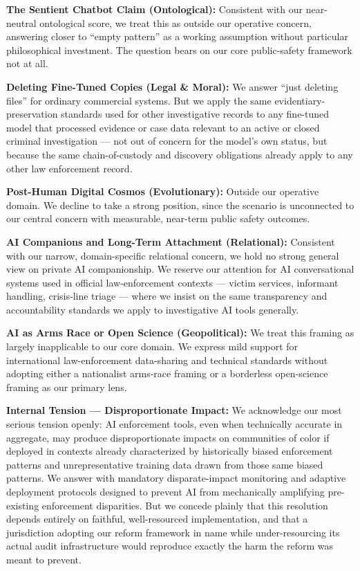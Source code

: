 \textbf{The Sentient Chatbot Claim (Ontological):} Consistent with our
near-neutral ontological score, we treat this as outside our operative
concern, answering closer to ``empty pattern'' as a working assumption
without particular philosophical investment. The question bears on our
core public-safety framework not at all.

\textbf{Deleting Fine-Tuned Copies (Legal \& Moral):} We answer ``just
deleting files'' for ordinary commercial systems. But we apply the same
evidentiary-preservation standards used for other investigative records
to any fine-tuned model that processed evidence or case data relevant to
an active or closed criminal investigation --- not out of concern for
the model's own status, but because the same chain-of-custody and
discovery obligations already apply to any other law enforcement record.

\textbf{Post-Human Digital Cosmos (Evolutionary):} Outside our operative
domain. We decline to take a strong position, since the scenario is
unconnected to our central concern with measurable, near-term public
safety outcomes.

\textbf{AI Companions and Long-Term Attachment (Relational):} Consistent
with our narrow, domain-specific relational concern, we hold no strong
general view on private AI companionship. We reserve our attention for
AI conversational systems used in official law-enforcement contexts ---
victim services, informant handling, crisis-line triage --- where we
insist on the same transparency and accountability standards we apply to
investigative AI tools generally.

\textbf{AI as Arms Race or Open Science (Geopolitical):} We treat this
framing as largely inapplicable to our core domain. We express mild
support for international law-enforcement data-sharing and technical
standards without adopting either a nationalist arms-race framing or a
borderless open-science framing as our primary lens.

\textbf{Internal Tension --- Disproportionate Impact:} We acknowledge
our most serious tension openly: AI enforcement tools, even when
technically accurate in aggregate, may produce disproportionate impacts
on communities of color if deployed in contexts already characterized by
historically biased enforcement patterns and unrepresentative training
data drawn from those same biased patterns. We answer with mandatory
disparate-impact monitoring and adaptive deployment protocols designed
to prevent AI from mechanically amplifying pre-existing enforcement
disparities. But we concede plainly that this resolution depends
entirely on faithful, well-resourced implementation, and that a
jurisdiction adopting our reform framework in name while
under-resourcing its actual audit infrastructure would reproduce exactly
the harm the reform was meant to prevent.

